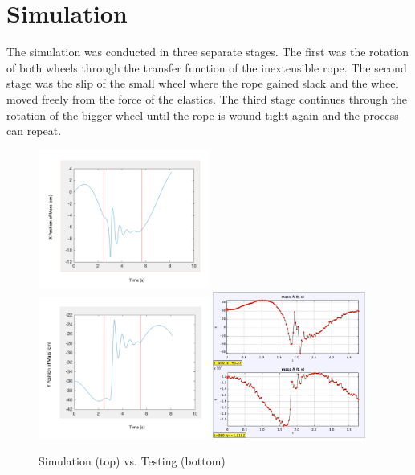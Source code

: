 \documentclass[twoside,twocolumn]{article}
\begin{document}
\section{Simulation}

The simulation was conducted in three separate stages. The first was the rotation of both wheels through the transfer function of the inextensible rope. The second stage was the slip of the small wheel where the rope gained slack and the wheel moved freely from the force of the elastics. The third stage continues through the rotation of the bigger wheel until the rope is wound tight again and the process can repeat.

\begin{figure}[!h]
    \caption{Simulation (top) vs. Testing (bottom)}
    \centering
        \includegraphics[width=0.5\textwidth]{x.png}
    \centering
        \includegraphics[width=0.5\textwidth]{y.png}
    \centering
        \includegraphics[width=0.45\textwidth]{tracking-plots.png}
\end{figure}
\end{document}
